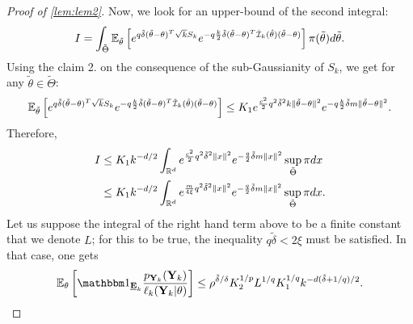 \begin{proof}[Proof of \cref{lem:lem2}]
Now, we look for an upper-bound of the second integral:
    \begin{equation}
  I = \int_{\tilde\Theta}\mathbb{E}_{\tilde\theta}\left[ e^{q\tilde\delta(\tilde\theta-\theta)^T\sqrt{k}S_k} e^{-q\frac{k}{2}\tilde\delta(\tilde\theta-\theta)^T\hat{\mathcal{I}}_k(\hat\theta)(\tilde\theta-\theta)}\right]\pi(\tilde\theta)d\tilde\theta .
    \end{equation}
%
Using the claim 2. on the consequence of the sub-Gaussianity of $S_k$, we get for any $\tilde\theta\in\tilde\Theta$:
    \begin{equation}
        \mathbb{E}_{\tilde\theta}\left[ e^{q\tilde\delta(\tilde\theta-\theta)^T\sqrt{k}S_k} e^{-q\frac{k}{2}\tilde\delta(\tilde\theta-\theta)^T\hat{\mathcal{I}}_k(\hat\theta)(\tilde\theta-\theta)}\right] \leq K_1 e^{\frac{c^2}{2}q^2\tilde\delta^2k\|\tilde\theta-\theta\|^2} e^{-q\frac{k}{2}\tilde\delta m\|\tilde\theta-\theta\|^2}.
    \end{equation}
Therefore,
\begin{align}
\nonumber
  I
    &\leq K_1k^{-d/2}\int_{\mathbb{R}^d} e^{\frac{c^2}{2}q^2\tilde\delta^2\|x\|^2} e^{-\frac{q}{2}\tilde\delta m\|x\|^2} \sup_{\tilde\Theta}\pi dx\\
       &\leq K_1k^{-d/2}\int_{\mathbb{R}^d} e^{\frac{m}{4\xi}q^2\tilde\delta^2\|x\|^2} e^{-\frac{q}{2}\tilde\delta m\|x\|^2} \sup_{\tilde\Theta}\pi dx.
\end{align}
Let us suppose the integral of the right hand term above to be a finite constant that we denote $L$; for this to be true, the inequality $q\tilde\delta<2\xi$ must be satisfied.
In that case, one gets 
\begin{equation}
     \EE_\theta\left[ \indic_{\ubf E_k} \frac{p_{\mbf Y_k}(\mbf Y_k)}{\ell_k(\mbf Y_k|\theta)} \right] \leq \rho^{\tilde\delta/\delta} K_2^{1/p}L^{1/q}K_1^{1/q} k^{-d(\tilde\delta+1/q)/2}. %
\end{equation}


\end{proof}
